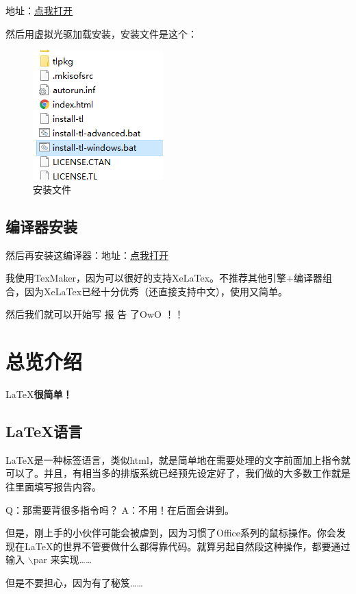 \documentclass[12pt,a4paper,oneside]{book}
\begin{document}
地址：\href{http://pan.baidu.com/share/link?uk=705221041&shareid=72337831&third=0&adapt=pc&from=wapforcetoweb}{点我打开}

\par

然后用虚拟光驱加载安装，安装文件是这个：
\par

\begin{figure}[htp] 
\centering 
\includegraphics[scale=0.75]{tl.png}
\caption{安装文件}%
\label{pic:tl}
\end{figure}
\vspace{2em}

\section{编译器安装}
\par
然后再安装这编译器：地址：\href{http://www.xm1math.net/texmaker/download.html}{点我打开}

\par
我使用TexMaker，因为可以很好的支持XeLaTex。不推荐其他引擎+编译器组合，因为XeLaTex已经十分优秀（还直接支持中文），使用又简单。
\par
然后我们就可以开始写 报 告 了OwO ！！
\chapter{总览介绍}
\begin{center}
\LaTeX {\bfseries {很简单！}}
\end{center}
\vspace{2em}
\section{LaTeX语言}
\LaTeX 是一种{\color{cyan}标签语言}，类似html，就是简单地在需要处理的文字前面加上指令就可以了。并且，有相当多的排版系统已经预先设定好了，我们做的大多数工作就是往里面填写报告内容。
\par
Q：那需要背很多指令吗？ A：{\color{cyan}不用}！在后面会讲到。
\par
但是，刚上手的小伙伴可能会被虐到，因为习惯了Office系列的鼠标操作。你会发现在\LaTeX 的世界不管要做什么都得靠{\color{cyan}代码}。就算另起自然段这种操作，都要通过输入 $\backslash$par 来实现……
\par
但是不要担心，因为有了秘笈……
\end{document}
